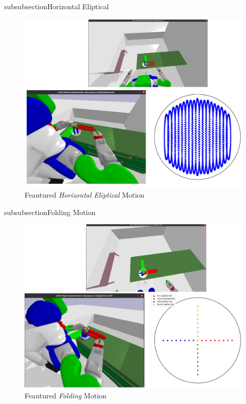 subsubsection{Horizontal Eliptical}
\begin{figure}[H]
    \centering
    \includegraphics[scale=0.27]{Graphics/horizontal_showcase.jpg}
    \caption{Feautured \textit{Horizontal Eliptical} Motion}
    \label{fig:circularshowcase}
\end{figure}

subsubsection{Folding Motion}
\begin{figure}[H]
    \centering
    \includegraphics[scale=0.27]{Graphics/folding_showcase.jpg}
    \caption{Feautured \textit{Folding} Motion}
    \label{fig:foldingshowcase}
\end{figure} 

